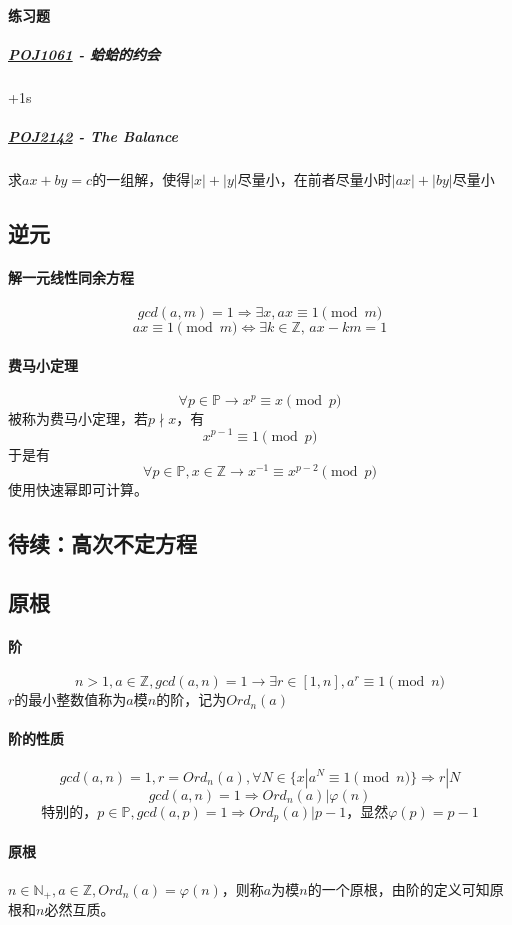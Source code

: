 \documentclass[]{cpp}
\begin{document}
\paragraph{练习题}
\subparagraph{\href{http://poj.org/problem?id=1061}{POJ1061} - 蛤蛤的约会} +1s
\subparagraph{\href{http://poj.org/problem?id=2142}{POJ2142} - The Balance} 求$ax+by=c$的一组解，使得$|x|+|y|$尽量小，在前者尽量小时$|ax|+|by|$尽量小
\subsection{逆元}
\paragraph{解一元线性同余方程}
	$$gcd(a,m)=1\Rightarrow\exists x,ax\equiv1\pmod{m}$$
	$$ax\equiv1\pmod{m}\iff\exists k\in\mathbb{Z},\,ax-km=1$$
\paragraph{费马小定理}
	$$\forall p\in\mathbb{P}\to x^p\equiv x\pmod{p}$$被称为费马小定理，若$p\nmid x$，有
	$$x^{p-1}\equiv 1\pmod{p}$$于是有
	$$\forall p\in\mathbb{P},x\in\mathbb{Z}\to x^{-1}\equiv x^{p-2}\pmod{p}$$
	使用快速幂即可计算。
\subsection{待续：高次不定方程}
\subsection{原根}
\paragraph{阶}
	$$n>1,a\in\mathbb{Z},gcd(a,n)=1\to\exists r\in[1,n],a^r\equiv1\pmod{n}$$ $r$的最小整数值称为$a$模$n$的阶，记为$Ord_n(a)$
\paragraph{阶的性质}
	$$gcd(a,n)=1,r=Ord_n(a),\forall N\in\{x|a^N\equiv1\pmod{n}\}\Rightarrow r|N$$
	$$gcd(a,n)=1\Rightarrow Ord_n(a)|\varphi(n)$$
	$$\mbox{特别的，}p\in\mathbb{P},gcd(a,p)=1\Rightarrow Ord_p(a)|p-1\mbox{，显然}\varphi(p)=p-1$$
\paragraph{原根} $n\in\mathbb{N_+},a\in\mathbb{Z},Ord_n(a)=\varphi(n)$，则称$a$为模$n$的一个原根，由阶的定义可知原根和$n$必然互质。
\end{document}
